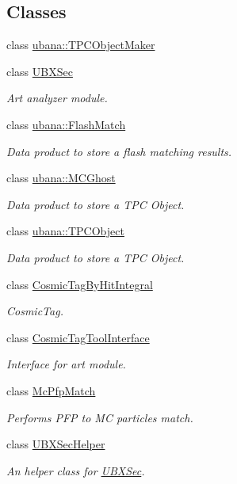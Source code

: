 \subsection*{Classes}
\begin{DoxyCompactItemize}
\item 
class \hyperlink{classubana_1_1TPCObjectMaker}{ubana\-::\-T\-P\-C\-Object\-Maker}
\item 
class \hyperlink{classUBXSec}{U\-B\-X\-Sec}
\begin{DoxyCompactList}\small\item\em Art analyzer module. \end{DoxyCompactList}\item 
class \hyperlink{classubana_1_1FlashMatch}{ubana\-::\-Flash\-Match}
\begin{DoxyCompactList}\small\item\em Data product to store a flash matching results. \end{DoxyCompactList}\item 
class \hyperlink{classubana_1_1MCGhost}{ubana\-::\-M\-C\-Ghost}
\begin{DoxyCompactList}\small\item\em Data product to store a T\-P\-C Object. \end{DoxyCompactList}\item 
class \hyperlink{classubana_1_1TPCObject}{ubana\-::\-T\-P\-C\-Object}
\begin{DoxyCompactList}\small\item\em Data product to store a T\-P\-C Object. \end{DoxyCompactList}\item 
class \hyperlink{classCosmicTagByHitIntegral}{Cosmic\-Tag\-By\-Hit\-Integral}
\begin{DoxyCompactList}\small\item\em Cosmic\-Tag. \end{DoxyCompactList}\item 
class \hyperlink{classCosmicTagToolInterface}{Cosmic\-Tag\-Tool\-Interface}
\begin{DoxyCompactList}\small\item\em Interface for art module. \end{DoxyCompactList}\item 
class \hyperlink{classMcPfpMatch}{Mc\-Pfp\-Match}
\begin{DoxyCompactList}\small\item\em Performs P\-F\-P to M\-C particles match. \end{DoxyCompactList}\item 
class \hyperlink{classUBXSecHelper}{U\-B\-X\-Sec\-Helper}
\begin{DoxyCompactList}\small\item\em An helper class for \hyperlink{classUBXSec}{U\-B\-X\-Sec}. \end{DoxyCompactList}\end{DoxyCompactItemize}

